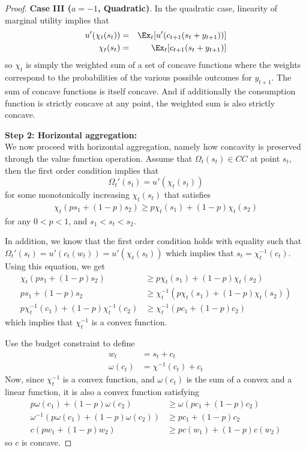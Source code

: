 \documentclass[titlepage]{\econtex}
\providecommand{\wAlt}{\omega}
\begin{document}
\begin{proof}
	
	
	
	\bigskip
	\noindent \textbf{Case III ($a = -1$, Quadratic)}.
	In the quadratic case, linearity of marginal utility implies that
	\begin{eqnarray*}
	u'(\chi_{t}(s_{t})) & = & \Ex_{t}[u'(c_{t+1}(s_{t}+{y}_{t+1}))]
	\\   \chi_{t}(s_{t}) & = & \Ex_{t}[c_{t+1}(s_{t}+{y}_{t+1})]
	\end{eqnarray*}
	so $\chi_{t}$ is simply the weighted sum of a set of
	concave functions where the weights correspond to the probabilities of the various possible outcomes for ${y}_{t+1}$. The sum of concave functions
	is itself concave. And if additionally the consumption function is strictly concave at any point, the weighted sum is also strictly concave.
	
	
	
	
	
	
	
	
	\bigskip
	\noindent \textbf{Step 2: Horizontal aggregation:} \\
	We now proceed with horizontal aggregation, namely how concavity is preserved through the value function operation. Assume that $\Omega_t(s_t) \in CC$ at point $s_t$, then the first order condition implies that
	\[\Omega_t'(s_t) = u'(\chi_t(s_t))\]
	for some monotonically increasing $\chi_t(s_t)$ that satisfies
	\begin{align}
	\chi_t(ps_1 + (1-p)s_2) \geq p\chi_t(s_1) + (1-p)\chi_t(s_2) \label{eq:hor_conc}
	\end{align}
	for any $0 < p < 1$, and $s_1 < s_t < s_2$. %
	
	In addition, we know that the first order condition holds with equality such that $\Omega_t'(s_t) = u'(c_t(w_t)) = u'(\chi_t(s_t))$ which implies that $s_t = \chi_t^{-1}(c_t)$. Using this equation, we get
	\begin{align*}
	\chi_t(ps_1 + (1-p)s_2) &\geq p\chi_t(s_1) + (1-p)\chi_t(s_2) \\
	ps_1 + (1-p)s_2 &\geq \chi_t^{-1}(p\chi_t(s_1) + (1-p)\chi_t(s_2)) \\
	p\chi_t^{-1}(c_1) + (1-p)\chi_t^{-1}(c_2) &\geq \chi_t^{-1}(pc_1 + (1-p)c_2)
	\end{align*}
	which implies that $\chi_t^{-1}$ is a convex function. 
	
	Use the budget constraint to define
	\begin{align*}
	w_t &= s_t + c_t \\ 
	\wAlt(c_t) & = \chi^{-1}(c_t) + c_t
	\end{align*} 
	Now, since $\chi_t^{-1}$ is a convex function, and $\wAlt(c_t)$ is the sum of a convex and a linear function, it is also a convex function satisfying
	\begin{align}
	p\wAlt(c_1) + (1-p)\wAlt(c_2) &\geq \wAlt(pc_1 + (1-p)c_2) \nonumber \\
	\wAlt^{-1}(p\wAlt(c_1) + (1-p)\wAlt(c_2)) &\geq pc_1 + (1-p)c_2 \nonumber \\
	c(pw_1 + (1-p)w_2) &\geq pc(w_1) + (1-p)c(w_2) \label{eq:hor_conc2}
	\end{align} 
	so $c$ is concave.
	

\end{proof}
\end{document}
